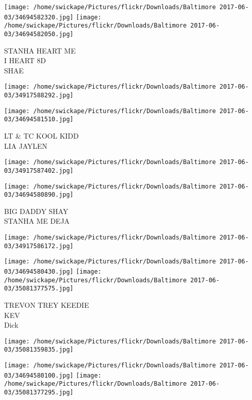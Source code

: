 \documentclass[10pt,letterpaper]{article}
\begin{document}
\vspace{0.25in}
\texttt{[image: /home/swickape/Pictures/flickr/Downloads/Baltimore 2017-06-03/34694582320.jpg]}
\texttt{[image: /home/swickape/Pictures/flickr/Downloads/Baltimore 2017-06-03/34694582050.jpg]}

STANHA HEART ME\\
I HEART 8D\\
SHAE\\
\pagebreak

\texttt{[image: /home/swickape/Pictures/flickr/Downloads/Baltimore 2017-06-03/34917588292.jpg]}

\vspace{0.25in}
\texttt{[image: /home/swickape/Pictures/flickr/Downloads/Baltimore 2017-06-03/34694581510.jpg]}

LT \& TC KOOL KIDD\\
LIA JAYLEN\\
\pagebreak

\texttt{[image: /home/swickape/Pictures/flickr/Downloads/Baltimore 2017-06-03/34917587402.jpg]}

\vspace{0.25in}
\texttt{[image: /home/swickape/Pictures/flickr/Downloads/Baltimore 2017-06-03/34694580890.jpg]}

BIG DADDY SHAY\\
STANHA ME DEJA\\
\pagebreak

\texttt{[image: /home/swickape/Pictures/flickr/Downloads/Baltimore 2017-06-03/34917586172.jpg]}

\vspace{0.25in}
\texttt{[image: /home/swickape/Pictures/flickr/Downloads/Baltimore 2017-06-03/34694580430.jpg]}
\texttt{[image: /home/swickape/Pictures/flickr/Downloads/Baltimore 2017-06-03/35081377575.jpg]}

TREVON TREY KEEDIE\\
KEV\\
Dick\\
\pagebreak

\texttt{[image: /home/swickape/Pictures/flickr/Downloads/Baltimore 2017-06-03/35081359835.jpg]}

\vspace{0.25in}
\texttt{[image: /home/swickape/Pictures/flickr/Downloads/Baltimore 2017-06-03/34694580100.jpg]}
\texttt{[image: /home/swickape/Pictures/flickr/Downloads/Baltimore 2017-06-03/35081377295.jpg]}
\end{document}
